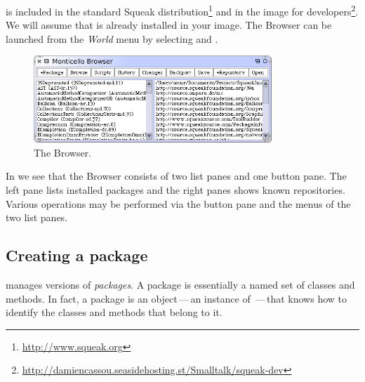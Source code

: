 \documentclass[a4paper,10pt,twoside]{book}
\begin{document}
\MC is included in the standard Squeak distribution\footnote{\url{http://www.squeak.org}} and in the image for developers\footnote{\url{http://damiencassou.seasidehosting.st/Smalltalk/squeak-dev}}.
We will assume that \MC is already installed in your image.
The \MC Browser can be launched from the \emph{World} menu by selecting  and .

\begin{figure}[ht]\centering
	\includegraphics[width=0.8\textwidth]{monticelloBrowser}
	\caption{The \MC Browser.}
\end{figure}

In  we see that the \MC Browser consists of two list panes and one button pane. The left pane lists installed packages and the right panes shows known repositories.
Various operations may be performed via the button pane and the menus of the two list panes.

\subsection{Creating a package}

\MC manages versions of \emph{packages}.  A package is essentially a named set of classes and methods.
In fact, a package is an object\,---\,an instance of \,---\,that knows how to identify the classes and methods that belong to it.
\end{document}
